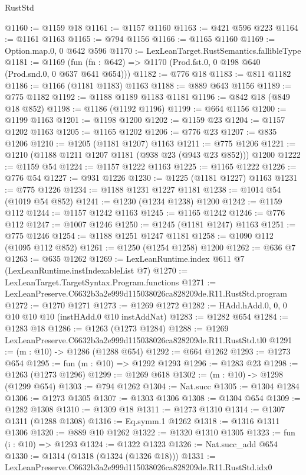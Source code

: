 \begin{lexlean}{RustStd}
\begin{coremodule}
@1160 := @1159 @18
@1161 := @1157 @1160
@1163 := @421 @596 @223
@1164 := @1161 @1163
@1165 := @794 @1156
@1166 := @1165 @1160
@1169 := Option.map.{0, 0} @642 @596
@1170 := LexLeanTarget.RustSemantics.fallibleType
@1181 := @1169
    (fun (fn : @642) => @1170 (Prod.fst.{0, 0} @198 @640 (Prod.snd.{0, 0} @637 @641 @654)))
@1182 := @776 @18
@1183 := @811 @1182
@1186 := @1166 (@1181 @1183) @1163
@1188 := @889 @643 @1156
@1189 := @775 @1182
@1192 := @1188 @1189 @1183 @1181
@1196 := @842 @18 (@849 @18 @852)
@1198 := @1186 (@1192 @1196)
@1199 := @664 @1156
@1200 := @1199 @1163
@1201 := @1198 @1200
@1202 := @1159 @23
@1204 := @1157 @1202 @1163
@1205 := @1165 @1202
@1206 := @776 @23
@1207 := @835 @1206
@1210 := @1205 (@1181 @1207) @1163
@1211 := @775 @1206
@1221 := @1210 (@1188 @1211 @1207 @1181 (@938 @23 (@943 @23 @852))) @1200
@1222 := @1159 @54
@1224 := @1157 @1222 @1163
@1225 := @1165 @1222
@1226 := @776 @54
@1227 := @931 @1226
@1230 := @1225 (@1181 @1227) @1163
@1231 := @775 @1226
@1234 := @1188 @1231 @1227 @1181
@1238 := @1014 @54 (@1019 @54 @852)
@1241 := @1230 (@1234 @1238) @1200
@1242 := @1159 @112
@1244 := @1157 @1242 @1163
@1245 := @1165 @1242
@1246 := @776 @112
@1247 := @1007 @1246
@1250 := @1245 (@1181 @1247) @1163
@1251 := @775 @1246
@1254 := @1188 @1251 @1247 @1181
@1258 := @1090 @112 (@1095 @112 @852)
@1261 := @1250 (@1254 @1258) @1200
@1262 := @636 @7
@1263 := @635 @1262
@1269 := LexLeanRuntime.index @611 @7 (LexLeanRuntime.instIndexableList @7)
@1270 := LexLeanTarget.TargetSyntax.Program.functions
@1271 := LexLeanPreserve.C6632b3a2e999d115038026ca828209de.R11.RustStd.program
@1272 := @1270 @1271
@1273 := @1269 @1272
@1282 := HAdd.hAdd.{0, 0, 0} @10 @10 @10 (instHAdd.{0} @10 instAddNat)
@1283 := @1282 @654
@1284 := @1283 @18
@1286 := @1263 (@1273 @1284)
@1288 := @1269 LexLeanPreserve.C6632b3a2e999d115038026ca828209de.R11.RustStd.tl0
@1291 := (m : @10) -> @1286 (@1288 @654)
@1292 := @664 @1262
@1293 := @1273 @654
@1295 := fun (m : @10) => @1292 @1293
@1296 := @1283 @23
@1298 := @1263 (@1273 @1296)
@1299 := @1269 @618
@1302 := (m : @10) -> @1298 (@1299 @654)
@1303 := @794 @1262
@1304 := Nat.succ
@1305 := @1304 @1284
@1306 := @1273 @1305
@1307 := @1303 @1306
@1308 := @1304 @654
@1309 := @1282 @1308
@1310 := @1309 @18
@1311 := @1273 @1310
@1314 := @1307 @1311 (@1288 @1308)
@1316 := Eq.symm.{1} @1262
@1318 := @1316 @1311 @1306
@1320 := @889 @10 @1262
@1322 := @1320 @1310 @1305
@1323 := fun (i : @10) => @1293
@1324 := @1322 @1323
@1326 := Nat.succ_add @654
@1330 := @1314 (@1318 (@1324 (@1326 @18)))
@1331 := LexLeanPreserve.C6632b3a2e999d115038026ca828209de.R11.RustStd.idx0

\end{coremodule}
\end{lexlean}
